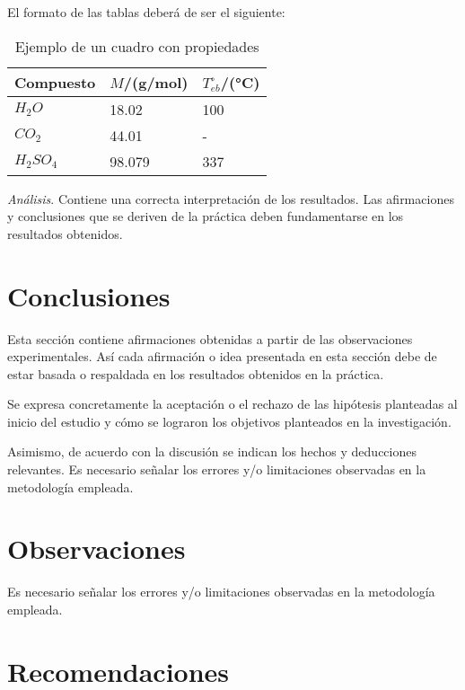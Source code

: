\documentclass{replab}
\begin{document}
El formato de las tablas deberá de ser el siguiente:

\begin{table}[hbt!]
    \centering
    \footnotesize
    \caption{Ejemplo de un cuadro con propiedades}
    \label{tab:propiedades}
    \begin{tabularx}{\columnwidth}{lYY}
            \hline
            \textbf{Compuesto} & \textbf{$M$/(g/mol)} & \textbf{$T_{eb}^{\circ}$/(°C)} \\
            \hline
            $H_2O$      & 18.02     & 100   \\
            $CO_2$      & 44.01     & -     \\
            $H_2SO_4$   & 98.079    & 337   \\
            \hline
    \end{tabularx}
\end{table}

\textit{Análisis}. Contiene una correcta interpretación de los resultados. Las afirmaciones y conclusiones que se deriven de la práctica deben fundamentarse en los resultados obtenidos.

\section{Conclusiones}

Esta sección contiene afirmaciones obtenidas a partir de las observaciones experimentales. Así cada afirmación o idea presentada en esta sección debe de estar basada o respaldada en los resultados obtenidos en la práctica.

Se expresa concretamente la aceptación o el rechazo de las hipótesis planteadas al inicio del estudio y cómo se lograron los objetivos planteados en la investigación.

Asimismo, de acuerdo con la discusión se indican los hechos y deducciones relevantes. Es necesario señalar los errores y/o limitaciones observadas en la metodología empleada.

\section{Observaciones}

Es necesario señalar los errores y/o limitaciones observadas en la metodología empleada.

\section{Recomendaciones}
\end{document}
